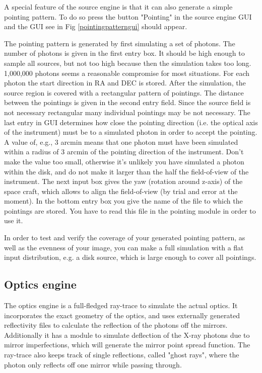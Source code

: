 A special feature of the source engine is that it can also generate a simple pointing pattern. To do so press the button "Pointing" in the source engine GUI and the GUI see in Fig \ref{pointingpatterngui} should appear. 

The pointing pattern is generated by first simulating a set of photons. The number of photons is given in the first entry box. It should be high enough to sample all sources, but not too high because then the simulation takes too long. 1,000,000 photons seems a reasonable compromise for most situations. For each photon the start direction in RA and DEC is stored. After the simulation, the source region is covered with a rectangular pattern of pointings. The distance between the pointings is given in the second entry field. Since the source field is not necessary rectangular many individual pointings may be not necessary. The last entry in GUI determines how close the pointing direction (i.e. the optical axis of the instrument) must be to a simulated photon in order to accept the pointing. A value of, e.g., 3 arcmin means that one photon must have been simulated within a radius of 3 arcmin of the pointing direction of the instrument. Don't make the value too small, otherwise it's unlikely you have simulated a photon within the disk, and do not make it larger than the half the field-of-view of the instrument.
The next input box gives the yaw (rotation around z-axis) of the space craft, which allows to align the field-of-view (by trial and error at the moment).  
In the bottom entry box you give the name of the file to which the pointings are stored. You have to read this file in the pointing module in order to use it. 

In order to test and verify the coverage of your generated pointing pattern, as well as the evenness of your image, you can make a full simulation with a flat input distribution, e.g. a disk source, which is large enough to cover all pointings.



\subsection{Optics engine}
The optics engine is a full-fledged ray-trace to simulate the actual optics. It incorporates the exact geometry of the optics, and uses externally generated reflectivity files to calculate the reflection of the photons off the mirrors. Additionally it has a module to simulate deflection of the X-ray photons due to mirror imperfections, which will generate the mirror point spread function. The ray-trace also keeps track of single reflections, called "ghost rays", where the photon only reflects off one mirror while passing through.

